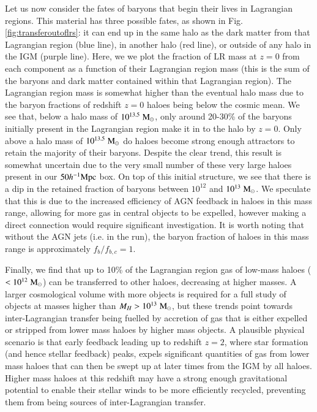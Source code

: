 Let us now consider the fates of baryons that begin their lives in Lagrangian
regions. This material has three possible fates, as shown in Fig.
\ref{fig:transferoutoflrs}: it can end up in the same halo as the dark matter
from that Lagrangian region (blue line), in another halo (red line), or
outside of any halo in the IGM (purple line). Here, we we plot the fraction
of LR mass at $z=0$ from each component as a function of their Lagrangian
region mass (this is the sum of the baryons and dark matter contained within
that Lagrangian region). The Lagrangian region mass is somewhat higher than
the eventual halo mass due to the baryon fractions of redshift $z=0$ haloes
being below the cosmic mean. We see that, below a halo mass of
$10^{13.5}\;{\rm M}_{\odot}{}$, only around 20-30\% of the baryons initially present in
the Lagrangian region make it in to the halo by $z=0$. Only above a halo mass
of $10^{13.5}\;{\rm M}_{\odot}{}$ do haloes become strong enough attractors to retain
the majority of their baryons. Despite the clear trend, this result is
somewhat uncertain due to the very small number of these very large haloes
present in our $50h^{-1}{\rm Mpc}{}$ box. On top of this initial structure, we see that
there is a dip in the retained fraction of baryons between $10^{12}$ and
$10^{13}\;{\rm M}_{\odot}{}$. We speculate that this is due to the increased efficiency
of AGN feedback in haloes in this mass range, allowing for more gas in
central objects to be expelled, however making a direct connection would
require significant investigation. It is worth noting that without the AGN
jets (i.e. in the \nojet{} run), the baryon fraction of haloes in this mass
range is approximately $f_b / f_{b,c} = 1$.

Finally, we find that up to 10\% of the Lagrangian region gas of low-mass
haloes ($<10^{12} \;{\rm M}_{\odot}{}$) can be transferred to other haloes, decreasing at
higher masses. A larger cosmological volume with more objects is required for
a full study of objects at masses higher than $M_H > 10^{13}\;{\rm M}_{\odot}{}$, but
these trends point towards inter-Lagrangian transfer being fuelled by
accretion of gas that is either expelled or stripped from lower mass haloes
by higher mass objects. A plausible physical scenario is that early
feedback leading up to redshift $z=2$, where star formation (and hence
stellar feedback) peaks, expels significant quantities of gas from lower mass
haloes that can then be swept up at later times from the IGM by all haloes.
Higher mass haloes at this redshift may have a strong enough gravitational
potential to enable their stellar winds to be more efficiently recycled,
preventing them from being sources of inter-Lagrangian transfer.

